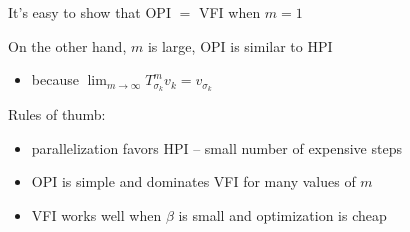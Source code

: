\documentclass[xcolor=dvipsnames]{beamer}
\newcommand{\1}{\mathbbm 1}
\begin{document}
\begin{frame}



    It's easy to show that OPI $=$ VFI  when $m=1$


    On the other hand, $m$ is large, OPI is similar to HPI 


    \vspace{0.5em}
    \begin{itemize}
        \item because $\lim_{m \to \infty} T^m_{\sigma_k} v_k = v_{\sigma_k}$
    \end{itemize}


    \vspace{0.5em}
    \vspace{0.5em}
    \vspace{0.5em}
    Rules of thumb:

    \begin{itemize}
        \item parallelization favors HPI -- small number of expensive steps
        \vspace{0.5em}
        \item OPI is simple and dominates VFI for many values of $m$
        \vspace{0.5em}
        \item VFI works well when $\beta$ is small and optimization is cheap
    \end{itemize}


\end{frame}
\end{document}
